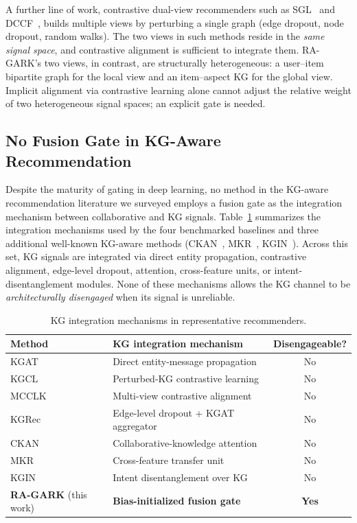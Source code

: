 A further line of work, contrastive dual-view recommenders such as SGL~\cite{wu2021sgl} and DCCF~\cite{ren2023dccf}, builds multiple views by perturbing a single graph (edge dropout, node dropout, random walks). The two views in such methods reside in the \emph{same signal space}, and contrastive alignment is sufficient to integrate them. RA-GARK's two views, in contrast, are structurally heterogeneous: a user--item bipartite graph for the local view and an item--aspect KG for the global view. Implicit alignment via contrastive learning alone cannot adjust the relative weight of two heterogeneous signal spaces; an explicit gate is needed.

\subsection{No Fusion Gate in KG-Aware Recommendation}
\label{sec:rw-gating-gap}

Despite the maturity of gating in deep learning, no method in the KG-aware recommendation literature we surveyed employs a fusion gate as the integration mechanism between collaborative and KG signals. Table~\ref{tab:rw-gating-gap} summarizes the integration mechanisms used by the four benchmarked baselines and three additional well-known KG-aware methods (CKAN~\cite{wang2020ckan}, MKR~\cite{wang2019mkr}, KGIN~\cite{wang2021kgin}). Across this set, KG signals are integrated via direct entity propagation, contrastive alignment, edge-level dropout, attention, cross-feature units, or intent-disentanglement modules. None of these mechanisms allows the KG channel to be \emph{architecturally disengaged} when its signal is unreliable.

\begin{table}[!htbp]
\centering
\caption{KG integration mechanisms in representative recommenders.}
\label{tab:rw-gating-gap}
\begin{tabular}{l l c}
\toprule
Method & KG integration mechanism & Disengageable? \\
\midrule
KGAT~\cite{wang2019kgat}      & Direct entity-message propagation        & No \\
KGCL~\cite{yang2022kgcl}      & Perturbed-KG contrastive learning        & No \\
MCCLK~\cite{zou2022mcclk}     & Multi-view contrastive alignment         & No \\
KGRec~\cite{yang2023kgrec}    & Edge-level dropout + KGAT aggregator     & No \\
CKAN~\cite{wang2020ckan}      & Collaborative-knowledge attention        & No \\
MKR~\cite{wang2019mkr}        & Cross-feature transfer unit              & No \\
KGIN~\cite{wang2021kgin}      & Intent disentanglement over KG           & No \\
\midrule
\textbf{RA-GARK} (this work)  & \textbf{Bias-initialized fusion gate}    & \textbf{Yes} \\
\bottomrule
\end{tabular}
\end{table}
\FloatBarrier

